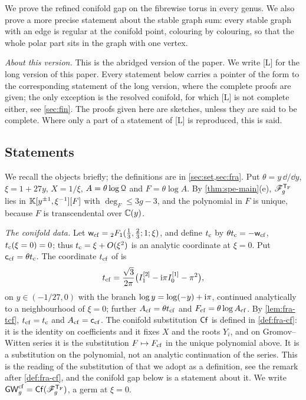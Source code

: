 We prove the refined conifold gap on the fibrewise torus in every genus. We also prove a more precise statement about the stable graph sum: every stable graph with an edge is regular at the conifold point, colouring by colouring, so that the whole polar part sits in the graph with one vertex.

\emph{About this version.} This is the abridged version of the paper. We write \textup{[L]} for the long version of this paper. Every statement below carries a pointer of the form  to the corresponding statement of the long version, where the complete proofs are given; the only exception is the resolved conifold, for which \textup{[L]} is not complete either, see \cref{sec:fin}. The proofs given here are sketches, unless they are said to be complete. Where only a part of a statement of \textup{[L]} is reproduced, this is said.

\subsection{Statements}
\label{sec:int-statements}

We recall the objects briefly; the definitions are in \cref{sec:set,sec:fra}. Put $\theta=y\,\dd/\dd y$, $\xi=1+27y$, $X=1/\xi$, $A=\theta\log\mathcal{Q}$ and $F=\theta\log A$. By \cref{thm:spe-main}(e), $\mathscr{F}_g^{\mathsf{T}_{\mathrm{F}}}$ lies in $\mathbb{K}[y^{\pm1},\xi^{-1}][F]$ with $\deg_F\leq 3g-3$, and the polynomial in $F$ is unique, because $F$ is transcendental over $\mathbb{C}(y)$.

\emph{The conifold data.} Let $\mathsf{w}_{\mathrm{cf}}={}_2F_1(\tfrac13,\tfrac23;1;\xi)$, and define $t_{\mathrm{c}}$ by $\theta t_{\mathrm{c}}=-\mathsf{w}_{\mathrm{cf}}$, $t_{\mathrm{c}}(\xi=0)=0$; thus $t_{\mathrm{c}}=\xi+O(\xi^2)$ is an analytic coordinate at $\xi=0$. Put $\mathsf{c}_{\mathrm{cf}}=\theta t_{\mathrm{c}}$. The coordinate $t_{\mathrm{cf}}$ of \cite{BS} is
\[
t_{\mathrm{cf}}=\frac{\sqrt3}{2\pi}\big(I_1^{[2]}-\mathrm{i}\pi I_0^{[1]}-\pi^2\big),
\]
on $y\in(-1/27,0)$ with the branch $\log y=\log(-y)+\mathrm{i}\pi$, continued analytically to a neighbourhood of $\xi=0$; further $A_{\mathrm{cf}}=\theta t_{\mathrm{cf}}$ and $F_{\mathrm{cf}}=\theta\log A_{\mathrm{cf}}$. By \cref{lem:fra-tcf}, $t_{\mathrm{cf}}=t_{\mathrm{c}}$ and $A_{\mathrm{cf}}=\mathsf{c}_{\mathrm{cf}}$. The conifold substitution $\mathsf{Cf}$ is defined in \cref{def:fra-cf}: it is the identity on coefficients and it fixes $X$ and the roots $Y_i$, and on Gromov--Witten series it is the substitution $F\mapsto F_{\mathrm{cf}}$ in the unique polynomial above. It is a substitution on the polynomial, not an analytic continuation of the series. This is the reading of the substitution of \cite{BS} that we adopt as a definition, see the remark after \cref{def:fra-cf}, and the conifold gap below is a statement about it. We write $\mathsf{GW}^{\mathrm{cf}}_g=\mathsf{Cf}(\mathscr{F}_g^{\mathsf{T}_{\mathrm{F}}})$, a germ at $\xi=0$.

